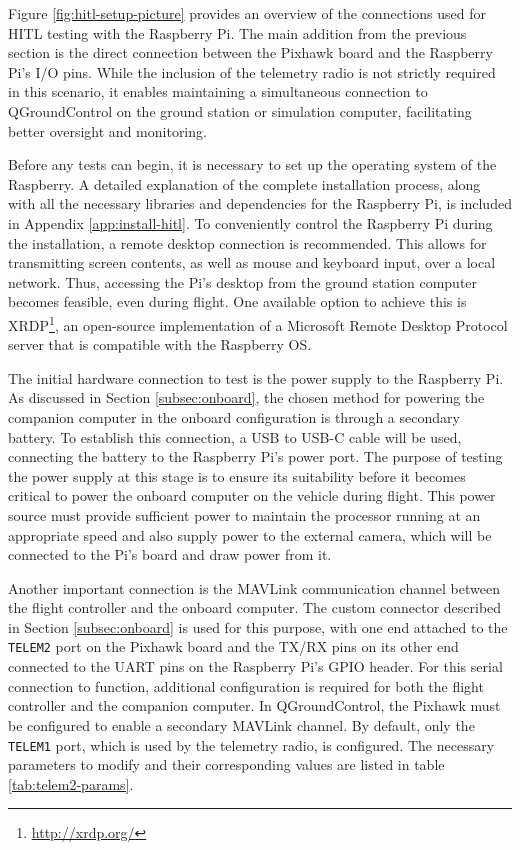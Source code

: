 Figure \ref{fig:hitl-setup-picture} provides an overview of the connections used for HITL testing with the Raspberry Pi. The main addition from the previous section is the direct connection between the Pixhawk board and the Raspberry Pi's I/O pins. While the inclusion of the telemetry radio is not strictly required in this scenario, it enables maintaining a simultaneous connection to QGroundControl on the ground station or simulation computer, facilitating better oversight and monitoring.

Before any tests can begin, it is necessary to set up the operating system of the Raspberry. A detailed explanation of the complete installation process, along with all the necessary libraries and dependencies for the Raspberry Pi, is included in Appendix \ref{app:install-hitl}. To conveniently control the Raspberry Pi during the installation, a remote desktop connection is recommended. This allows for transmitting screen contents, as well as mouse and keyboard input, over a local network. Thus, accessing the Pi's desktop from the ground station computer becomes feasible, even during flight. One available option to achieve this is XRDP\footnote{\url{http://xrdp.org/}}, an open-source implementation of a Microsoft Remote Desktop Protocol server that is compatible with the Raspberry OS.


The initial hardware connection to test is the power supply to the Raspberry Pi. As discussed in Section \ref{subsec:onboard}, the chosen method for powering the companion computer in the onboard configuration is through a secondary battery. To establish this connection, a USB to USB-C cable will be used, connecting the battery to the Raspberry Pi's power port. The purpose of testing the power supply at this stage is to ensure its suitability before it becomes critical to power the onboard computer on the vehicle during flight. This power source must provide sufficient power to maintain the processor running at an appropriate speed and also supply power to the external camera, which will be connected to the Pi's board and draw power from it.


Another important connection is the MAVLink communication channel between the flight controller and the onboard computer. The custom connector described in Section \ref{subsec:onboard} is used for this purpose, with one end attached to the \texttt{TELEM2} port on the Pixhawk board and the TX/RX pins on its other end connected to the UART pins on the Raspberry Pi's GPIO header. For this serial connection to function, additional configuration is required for both the flight controller and the companion computer. In QGroundControl, the Pixhawk must be configured to enable a secondary MAVLink channel. By default, only the \texttt{TELEM1} port, which is used by the telemetry radio, is configured. The necessary parameters to modify and their corresponding values are listed in table \ref{tab:telem2-params}.

